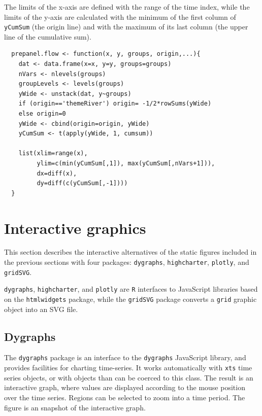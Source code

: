 \documentclass[smallroyalvopaper]{memoir}
\begin{document}
The limits of the x-axis are defined with the range of the time index,
while the limits of the y-axis are calculated with the minimum of the
first column of \texttt{yCumSum} (the origin line) and with the maximum of
its last column (the upper line of the cumulative sum).

\lstset{language=r,label= ,caption= ,captionpos=b,numbers=none}
\begin{lstlisting}
  prepanel.flow <- function(x, y, groups, origin,...){
    dat <- data.frame(x=x, y=y, groups=groups)
    nVars <- nlevels(groups)
    groupLevels <- levels(groups)
    yWide <- unstack(dat, y~groups)
    if (origin=='themeRiver') origin= -1/2*rowSums(yWide)
    else origin=0
    yWide <- cbind(origin=origin, yWide)
    yCumSum <- t(apply(yWide, 1, cumsum))
  
    list(xlim=range(x),
         ylim=c(min(yCumSum[,1]), max(yCumSum[,nVars+1])),
         dx=diff(x),
         dy=diff(c(yCumSum[,-1])))
  }
\end{lstlisting}


\section{Interactive graphics \label{sec:interactive_horizontal}}
\label{sec:org87cf8db}
This section describes the interactive alternatives of the static
figures included in the previous sections with four packages:
\texttt{dygraphs}, \texttt{highcharter}, \texttt{plotly}, and \texttt{gridSVG}.

\texttt{dygraphs}, \texttt{highcharter}, and \texttt{plotly} are \texttt{R} interfaces to
JavaScript libraries based on the \texttt{htmlwidgets} package, while the
\texttt{gridSVG} package converts a \texttt{grid} graphic object into an SVG file.

\subsection{Dygraphs \label{sec:dygraphs}}
\label{sec:org773b777}
The \texttt{dygraphs} package is an interface to the \texttt{dygraphs} JavaScript
library, and provides facilities for charting time-series. It works
automatically with \texttt{xts} time series objects, or with objects than can
be coerced to this class. The result is an interactive graph, where
values are displayed according to the mouse position over the time
series. Regions can be selected to zoom into a time period. The figure
\label{fig:dygraphs} is an snapshot of the interactive graph.
\end{document}
